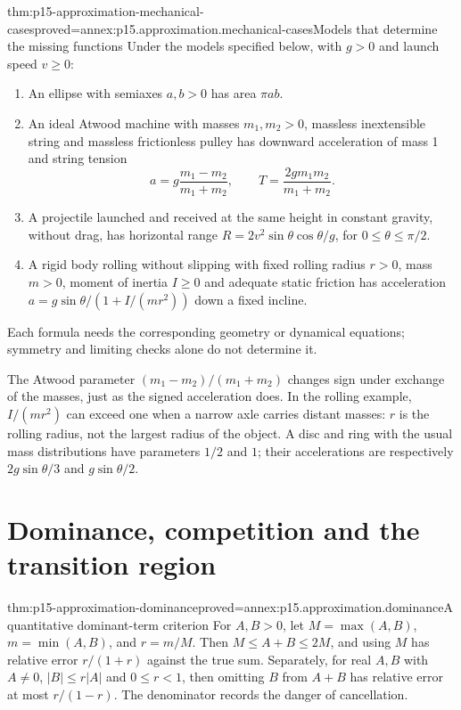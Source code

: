 \begin{hbtheorem}{thm:p15-approximation-mechanical-cases}{proved=annex:p15.approximation.mechanical-cases}{Models that determine the missing functions}
Under the models specified below, with \(g>0\) and launch speed \(v\geq0\):
\begin{enumerate}
\item An ellipse with semiaxes \(a,b>0\) has area \(\pi ab\).
\item An ideal Atwood machine with masses \(m_1,m_2>0\), massless
inextensible string and massless frictionless pulley has downward
acceleration of mass 1 and string tension
\[
 a=g\frac{m_1-m_2}{m_1+m_2},\qquad
 T=\frac{2gm_1m_2}{m_1+m_2}.
\]
\item A projectile launched and received at the same height in constant
gravity, without drag, has horizontal range
\(R=2v^2\sin\theta\cos\theta/g\), for \(0\leq\theta\leq\pi/2\).
\item A rigid body rolling without slipping with fixed rolling radius
\(r>0\), mass \(m>0\), moment of inertia \(I\geq0\) and adequate static
friction has acceleration
\(a=g\sin\theta/(1+I/(mr^2))\) down a fixed incline.
\end{enumerate}
Each formula needs the corresponding geometry or dynamical equations;
symmetry and limiting checks alone do not determine it.
\end{hbtheorem}

The Atwood parameter \((m_1-m_2)/(m_1+m_2)\) changes sign under exchange of
the masses, just as the signed acceleration does. In the rolling example,
\(I/(mr^2)\) can exceed one when a narrow axle carries distant masses:
\(r\) is the rolling radius, not the largest radius of the object. A disc
and ring with the usual mass distributions have parameters \(1/2\) and
\(1\); their accelerations are respectively \(2g\sin\theta/3\) and
\(g\sin\theta/2\).

\section{Dominance, competition and the transition region}

\begin{hbtheorem}{thm:p15-approximation-dominance}{proved=annex:p15.approximation.dominance}{A quantitative dominant-term criterion}
For \(A,B>0\), let \(M=\max(A,B)\), \(m=\min(A,B)\), and \(r=m/M\).
Then \(M\leq A+B\leq2M\), and using \(M\) has relative error
\(r/(1+r)\) against the true sum. Separately, for real \(A,B\) with
\(A\ne0\), \(|B|\leq r|A|\) and \(0\leq r<1\),
then omitting \(B\) from \(A+B\) has relative error at most \(r/(1-r)\).
The denominator records the danger of cancellation.
\end{hbtheorem}

